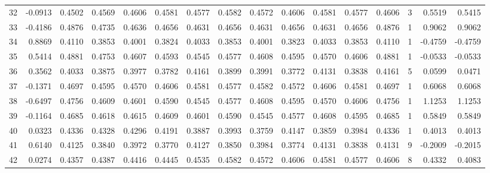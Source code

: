 \begin{tabular}{lrrrrrrrrrrrrrrr}
32  &     -0.0913 &  0.4502 &  0.4569 &  0.4606 &  0.4581 &  0.4577 &  0.4582 &  0.4572 &  0.4606 &  0.4581 &   0.4577 &     0.4606 &      3 &                    0.5519 &                     0.5415 \\
33  &     -0.4186 &  0.4876 &  0.4735 &  0.4636 &  0.4656 &  0.4631 &  0.4656 &  0.4631 &  0.4656 &  0.4631 &   0.4656 &     0.4876 &      1 &                    0.9062 &                     0.9062 \\
34  &      0.8869 &  0.4110 &  0.3853 &  0.4001 &  0.3824 &  0.4033 &  0.3853 &  0.4001 &  0.3823 &  0.4033 &   0.3853 &     0.4110 &      1 &                   -0.4759 &                    -0.4759 \\
35  &      0.5414 &  0.4881 &  0.4753 &  0.4607 &  0.4593 &  0.4545 &  0.4577 &  0.4608 &  0.4595 &  0.4570 &   0.4606 &     0.4881 &      1 &                   -0.0533 &                    -0.0533 \\
36  &      0.3562 &  0.4033 &  0.3875 &  0.3977 &  0.3782 &  0.4161 &  0.3899 &  0.3991 &  0.3772 &  0.4131 &   0.3838 &     0.4161 &      5 &                    0.0599 &                     0.0471 \\
37  &     -0.1371 &  0.4697 &  0.4595 &  0.4570 &  0.4606 &  0.4581 &  0.4577 &  0.4582 &  0.4572 &  0.4606 &   0.4581 &     0.4697 &      1 &                    0.6068 &                     0.6068 \\
38  &     -0.6497 &  0.4756 &  0.4609 &  0.4601 &  0.4590 &  0.4545 &  0.4577 &  0.4608 &  0.4595 &  0.4570 &   0.4606 &     0.4756 &      1 &                    1.1253 &                     1.1253 \\
39  &     -0.1164 &  0.4685 &  0.4618 &  0.4615 &  0.4609 &  0.4601 &  0.4590 &  0.4545 &  0.4577 &  0.4608 &   0.4595 &     0.4685 &      1 &                    0.5849 &                     0.5849 \\
40  &      0.0323 &  0.4336 &  0.4328 &  0.4296 &  0.4191 &  0.3887 &  0.3993 &  0.3759 &  0.4147 &  0.3859 &   0.3984 &     0.4336 &      1 &                    0.4013 &                     0.4013 \\
41  &      0.6140 &  0.4125 &  0.3840 &  0.3972 &  0.3770 &  0.4127 &  0.3850 &  0.3984 &  0.3774 &  0.4131 &   0.3838 &     0.4131 &      9 &                   -0.2009 &                    -0.2015 \\
42  &      0.0274 &  0.4357 &  0.4387 &  0.4416 &  0.4445 &  0.4535 &  0.4582 &  0.4572 &  0.4606 &  0.4581 &   0.4577 &     0.4606 &      8 &                    0.4332 &                     0.4083 \\

\end{tabular}
